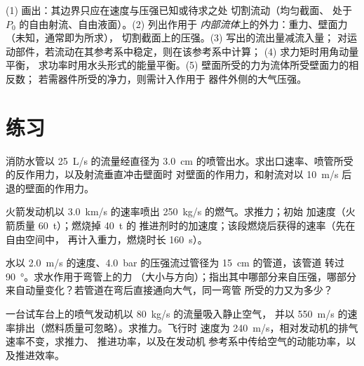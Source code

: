 \begin{method}[建立平衡方程]\label{met:b2:flow-balances:method}
(1) 画出：其边界只应在速度与压强已知或待求之处
切割流动（均匀截面、
处于 $P_0$ 的自由射流、自由液面）。(2) 列出作用于
\emph{内部流体}上的外力：重力、壁面力（未知，通常即为所求），
切割截面上的压强。(3) 写出的流出量减流入量；
对运动部件，若流动在其参考系中稳定，则在该参考系中计算；
(4) 求力矩时用角动量平衡，
求功率时用水头形式的能量平衡。(5) 壁面所受的力为流体所受壁面力的相反数；
若需器件所受的净力，则需计入作用于
器件外侧的大气压强。
\end{method}

\section{练习}

\begin{exercise}[$\star$]\label{exo:b2:flow-balances:1}
消防水管以 \qty{25}{L/s} 的流量经直径为 \qty{3.0}{cm}
的喷管出水。求出口速率、喷管所受的反作用力，以及射流垂直冲击壁面时
对壁面的作用力，和射流对以 \qty{10}{m/s} 后退的壁面的作用力。
\end{exercise}

\begin{exercise}[$\star$]\label{exo:b2:flow-balances:2}
火箭发动机以 \qty{3.0}{km/s} 的速率喷出 \qty{250}{kg/s} 的燃气。求推力；初始
加速度（火箭质量 \qty{60}{t}）；燃烧掉 \qty{40}{t} 的
推进剂时的加速度；该段燃烧后获得的速率（先在自由空间中，
再计入重力，燃烧时长 \qty{160}{s}）。
\end{exercise}

\begin{exercise}[$\star$]\label{exo:b2:flow-balances:3}
水以 \qty{2.0}{m/s} 的速度、\qty{4.0}{bar} 的压强流过管径为 \qty{15}{cm} 的管道，该管道
转过 \qty{90}{\degree}。求水作用于弯管上的力
（大小与方向）；指出其中哪部分来自压强，哪部分
来自动量变化？若管道在弯后直接通向大气，同一弯管
所受的力又为多少？
\end{exercise}

\begin{exercise}[$\star$]\label{exo:b2:flow-balances:4}
一台试车台上的喷气发动机以 \qty{80}{kg/s} 的流量吸入静止空气，
并以 \qty{550}{m/s} 的速率排出（燃料质量可忽略）。求推力。飞行时
速度为 \qty{240}{m/s}，相对发动机的排气速率不变，求推力、
推进功率，以及在发动机
参考系中传给空气的动能功率，以及推进效率。
\end{exercise}


